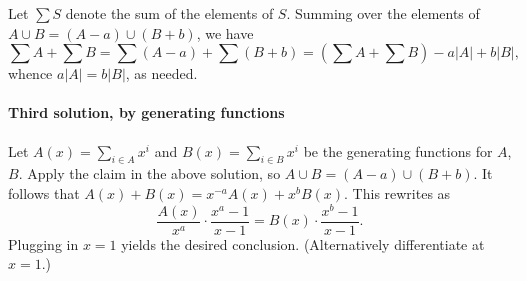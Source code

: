 Let $\sum S$ denote the sum of the elements of $S$. Summing over the elements of $A\cup B=(A-a)\cup(B+b)$, we have \[\sum A+\sum B=\sum(A-a)+\sum(B+b)=\left(\sum A+\sum B\right)-a|A|+b|B|,\]
whence $a|A|=b|B|$, as needed.

\paragraph{Third solution, by generating functions} Let $A(x)=\sum_{i\in A}x^i$ and $B(x)=\sum_{i\in B}x^i$ be the generating functions for $A$, $B$. Apply the claim in the above solution, so $A\cup B=(A-a)\cup(B+b)$. It follows that $A(x)+B(x)=x^{-a}A(x)+x^bB(x)$. This rewrites as \[\frac{A(x)}{x^a}\cdot\frac{x^a-1}{x-1}=B(x)\cdot\frac{x^b-1}{x-1}.\]
Plugging in $x=1$ yields the desired conclusion. (Alternatively differentiate at $x=1$.)
